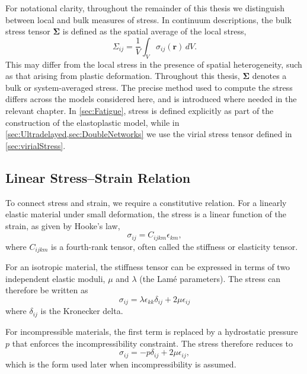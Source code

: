 For notational clarity, throughout the remainder of this thesis we distinguish between local and bulk measures of stress. In continuum descriptions, the bulk stress tensor $\bm{\Sigma}$ is defined as the spatial average of the local stress,
\begin{equation}
    \Sigma_{ij}=\frac{1}{V}\int_V \sigma_{ij}(\bm{r})\, dV.
\end{equation}
This may differ from the local stress in the presence of spatial heterogeneity, such as that arising from plastic deformation. Throughout this thesis, $\bm{\Sigma}$ denotes a bulk or system-averaged stress. The precise method used to compute the stress differs across the models considered here, and is introduced where needed in the relevant chapter. In \cref{sec:Fatigue}, stress is defined explicitly as part of the construction of the elastoplastic model, while in \cref{sec:Ultradelayed,sec:DoubleNetworks} we use the virial stress tensor defined in \cref{sec:virialStress}.

\subsection{Linear Stress--Strain Relation}

To connect stress and strain, we require a constitutive relation. For a linearly elastic material under small deformation, the stress is a linear function of the strain, as given by Hooke’s law,
\[
    \sigma_{ij} = C_{ijkm}\epsilon_{km},
\]
where $C_{ijkm}$ is a fourth-rank tensor, often called the stiffness or elasticity tensor.

For an isotropic material, the stiffness tensor can be expressed in terms of two independent elastic moduli, $\mu$ and $\lambda$ (the Lam\'e parameters). The stress can therefore be written as
\[
    \sigma_{ij} = \lambda \epsilon_{kk} \delta_{ij} + 2\mu \epsilon_{ij}
\]
where $\delta_{ij}$ is the Kronecker delta.

For incompressible materials, the first term is replaced by a hydrostatic pressure $p$ that enforces the incompressibility constraint. The stress therefore reduces to
\begin{equation}
    \sigma_{ij} = -p\delta_{ij} + 2\mu\epsilon_{ij},
    \label{eq:incompressibleStress}
\end{equation}
which is the form used later when incompressibility is assumed.

